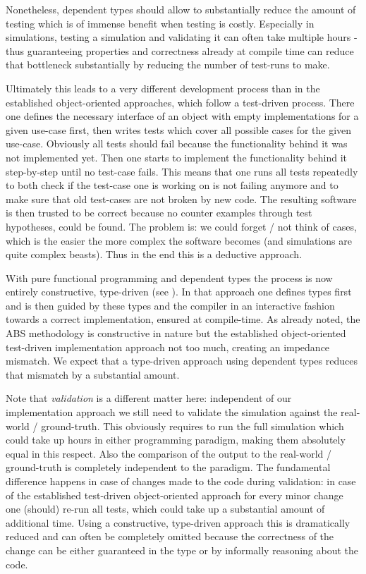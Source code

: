 Nonetheless, dependent types should allow to substantially reduce the amount of testing which is of immense benefit when testing is costly. Especially in simulations, testing a simulation and validating it can often take multiple hours - thus guaranteeing properties and correctness already at compile time can reduce that bottleneck substantially by reducing the number of test-runs to make.

Ultimately this leads to a very different development process than in the established object-oriented approaches, which follow a test-driven process. There one defines the necessary interface of an object with empty implementations for a given use-case first, then writes tests which cover all possible cases for the given use-case. Obviously all tests should fail because the functionality behind it was not implemented yet. Then one starts to implement the functionality behind it  step-by-step until no test-case fails. This means that one runs all tests repeatedly to both check if the test-case one is working on is not failing anymore and to make sure that old test-cases are not broken by new code. The resulting software is then trusted to be correct because no counter examples through test hypotheses, could be found. The problem is: we could forget / not think of cases, which is the easier the more complex the software becomes (and simulations are quite complex beasts). Thus in the end this is a deductive approach.

With pure functional programming and dependent types the process is now entirely constructive, type-driven (see \cite{brady_type-driven_2017}). In that approach one defines types first and is then guided by these types and the compiler in an interactive fashion towards a correct implementation, ensured at compile-time. As already noted, the ABS methodology is constructive in nature but the established object-oriented test-driven implementation approach not too much, creating an impedance mismatch. We expect that a type-driven approach using dependent types reduces that mismatch by a substantial amount.

Note that \textit{validation} is a different matter here: independent of our implementation approach we still need to validate the simulation against the real-world / ground-truth. This obviously requires to run the full simulation which could take up hours in either programming paradigm, making them absolutely equal in this respect. Also the comparison of the output to the real-world / ground-truth is completely independent to the paradigm. The fundamental difference happens in case of changes made to the code during validation: in case of the established test-driven object-oriented approach for every minor change one (should) re-run all tests, which could take up a substantial amount of additional time. Using a constructive, type-driven approach this is dramatically reduced and can often be completely omitted because the correctness of the change can be either guaranteed in the type or by informally reasoning about the code.

